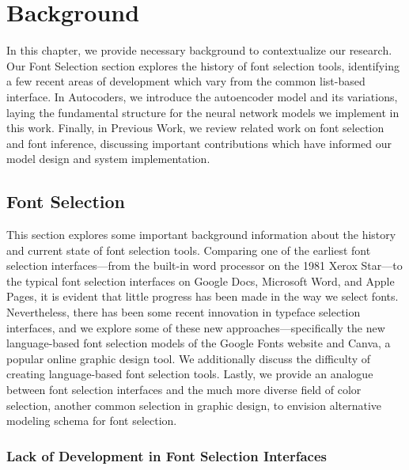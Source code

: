 \chapter{Background}
\label{chap:background}

In this chapter, we provide necessary background to contextualize our research. Our Font Selection section explores the history of font selection tools, identifying a few recent areas of development which vary from the common list-based interface. In Autocoders, we introduce the autoencoder model and its variations, laying the fundamental structure for the neural network models we implement in this work. Finally, in Previous Work, we review related work on font selection and font inference, discussing important contributions which have informed our model design and system implementation.

\section{Font Selection}

This section explores some important background information about the history and current state of font selection tools. Comparing one of the earliest font selection interfaces---from the built-in word processor on the 1981 Xerox Star---to the typical font selection interfaces on Google Docs, Microsoft Word, and Apple Pages, it is evident that little progress has been made in the way we select fonts. Nevertheless, there has been some recent innovation in typeface selection interfaces, and we explore some of these new approaches---specifically the new language-based font selection models of the Google Fonts website and Canva, a popular online graphic design tool. We additionally discuss the difficulty of creating language-based font selection tools. Lastly, we provide an analogue between font selection interfaces and the much more diverse field of color selection, another common selection in graphic design, to envision alternative modeling schema for font selection.

\subsection{Lack of Development in Font Selection Interfaces}

